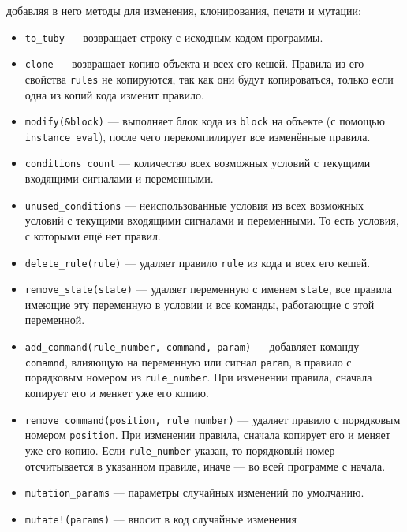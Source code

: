 \documentclass[utf8,a5paper,portrait,10pt]{eskdtext}
\begin{document}
\begin{itemize}
       добавляя в него методы для изменения, клонирования, печати и мутации:
       \begin{itemize}
         \item \texttt{to\_tuby} — возвращает строку с исходным кодом программы.
         \item \texttt{clone} — возвращает копию объекта и всех его кешей.
               Правила из его свойства \texttt{rules} не копируются, так как они
               будут копироваться, только если одна из копий кода изменит
               правило.
         \item \texttt{modify(\&block)} — выполняет блок кода из \texttt{block}
               на объекте (с помощью \texttt{instance\_eval}), после чего
               перекомпилирует все изменённые правила.
         \item \texttt{conditions\_count} — количество всех возможных условий
               с текущими входящими сигналами и переменными.
         \item \texttt{unused\_conditions} — неиспользованные условия из
               всех возможных условий с текущими входящими сигналами и
               переменными. То есть условия, с которыми ещё нет правил.
         \item \texttt{delete\_rule(rule)} — удаляет правило \texttt{rule} из
               кода и всех его кешей.
         \item \texttt{remove\_state(state)} — удаляет переменную с именем
               \texttt{state}, все правила имеющие эту переменную в условии и
               все команды, работающие с этой переменной.
         \item \texttt{add\_command(rule\_number, command, param)} — добавляет
               команду \texttt{comamnd}, влияющую на переменную или сигнал
               \texttt{param}, в правило с порядковым номером из
               \texttt{rule\_number}. При изменении правила, сначала копирует
               его и меняет уже его копию.
         \item \texttt{remove\_command(position, rule\_number)} — удаляет
               правило с порядковым номером \texttt{position}. При изменении
               правила, сначала копирует его и меняет уже его копию. Если
               \texttt{rule\_number} указан, то порядковый номер отсчитывается
               в указанном правиле, иначе — во всей программе с начала.
         \item \texttt{mutation\_params} — параметры случайных изменений по
               умолчанию.
         \item \texttt{mutate!(params)} — вносит в код случайные изменения

\end{itemize}
\end{itemize}
\end{document}
